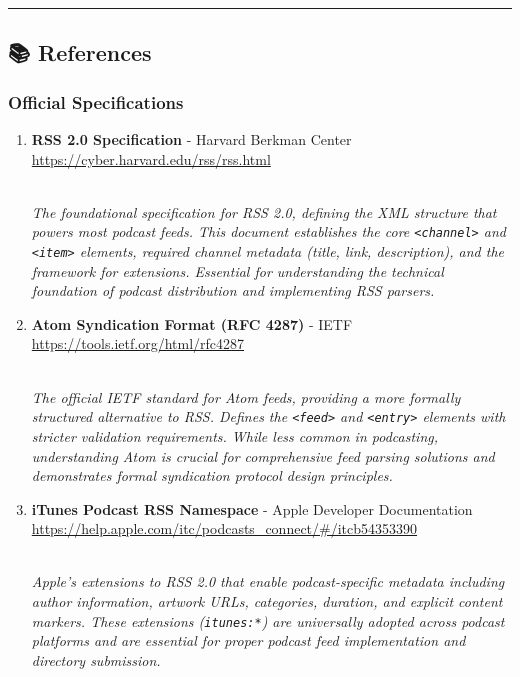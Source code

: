 \documentclass[
  letterpaper,
  DIV=11,
  numbers=noendperiod]{scrartcl}
\begin{document}
\begin{center}\rule{0.5\linewidth}{0.5pt}\end{center}

\subsection{📚 References}\label{references}

\subsubsection{Official Specifications}\label{official-specifications}

\begin{enumerate}
\def\labelenumi{\arabic{enumi}.}
\item
  \textbf{RSS 2.0 Specification} - Harvard Berkman Center\\
  \url{https://cyber.harvard.edu/rss/rss.html}\strut \\
  \emph{The foundational specification for RSS 2.0, defining the XML
  structure that powers most podcast feeds. This document establishes
  the core \texttt{\textless{}channel\textgreater{}} and
  \texttt{\textless{}item\textgreater{}} elements, required channel
  metadata (title, link, description), and the framework for extensions.
  Essential for understanding the technical foundation of podcast
  distribution and implementing RSS parsers.}
\item
  \textbf{Atom Syndication Format (RFC 4287)} - IETF\\
  \url{https://tools.ietf.org/html/rfc4287}\strut \\
  \emph{The official IETF standard for Atom feeds, providing a more
  formally structured alternative to RSS. Defines the
  \texttt{\textless{}feed\textgreater{}} and
  \texttt{\textless{}entry\textgreater{}} elements with stricter
  validation requirements. While less common in podcasting,
  understanding Atom is crucial for comprehensive feed parsing solutions
  and demonstrates formal syndication protocol design principles.}
\item
  \textbf{iTunes Podcast RSS Namespace} - Apple Developer
  Documentation\\
  \url{https://help.apple.com/itc/podcasts_connect/\#/itcb54353390}\strut \\
  \emph{Apple's extensions to RSS 2.0 that enable podcast-specific
  metadata including author information, artwork URLs, categories,
  duration, and explicit content markers. These extensions
  (\texttt{itunes:*}) are universally adopted across podcast platforms
  and are essential for proper podcast feed implementation and directory
  submission.}
\end{enumerate}
\end{document}
